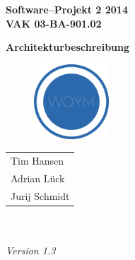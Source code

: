 \documentclass[fontsize=12pt,paper=a4,twoside]{scrartcl}
\begin{document}
  \thispagestyle{fancy}
  \fancyhead[LO,RE]{ }
  \fancyfoot[C]{}

  \vspace{3cm}

  \begin{minipage}[H]{\textwidth}
  \begin{center}
  \bf
  \Large
  Software--Projekt 2 2014\\
  \smallskip
  \small
  VAK 03-BA-901.02\\
  \vspace{3cm}
  \end{center}
  \end{minipage}
  \begin{minipage}[H]{\textwidth}
  \begin{center}
  \vspace{1cm}
  \bf
  \Large Architekturbeschreibung\\
  \vspace{3ex}
   	  \begin{figure}[H]
      \centering
      \includegraphics[width=0.25\textwidth]{../WOYM.png}
      \end{figure}
  \vfill
  \end{center}
  \end{minipage}
  \vfill
  \begin{minipage}[H]{\textwidth}
  \begin{center}
  \sf
  \begin{tabular}{l}
  Tim Hansen \\
  Adrian Lück \\
  Jurij Schmidt\\
  \end{tabular}
  \\ ~
  \vspace{2cm}
  \\
  \it Version 1.3\\ ~
  \end{center}
  \end{minipage}
\end{document}
